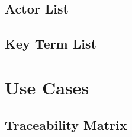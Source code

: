\documentclass[10pt, draft]{article}
\begin{document}
\subsection{Actor List}

\subsection{Key Term List}

\section{Use Cases}

\subsection*{Traceability Matrix}
\end{document}
